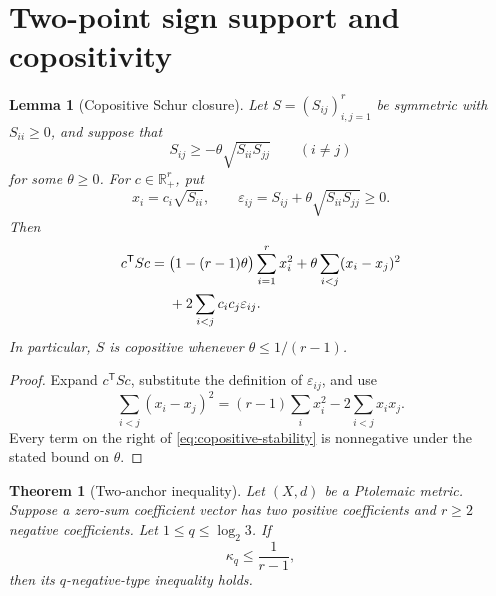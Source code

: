 \documentclass[11pt]{amsart}
\newtheorem{theorem}{Theorem}[section]
\newtheorem{lemma}[lemma]{Lemma}
\theoremstyle{definition}
\theoremstyle{remark}
\newcommand{\R}{\mathbb R}
\begin{document}
\section{Two-point sign support and copositivity}

\begin{lemma}[Copositive Schur closure]\label{lem:copositive-closure}
Let $S=(S_{ij})_{i,j=1}^r$ be symmetric with $S_{ii}\ge0$, and suppose that
\[
 S_{ij}\ge-\theta\sqrt{S_{ii}S_{jj}}
 \qquad(i\ne j)
\]
for some $\theta\ge0$. For $c\in\R_+^r$, put
\[
 x_i=c_i\sqrt{S_{ii}},
 \qquad
 \varepsilon_{ij}=S_{ij}+\theta\sqrt{S_{ii}S_{jj}}\ge0.
\]
Then
\begin{align}
 c^{\mathsf T}Sc
 ={}&
 \bigl(1-(r-1)\theta\bigr)\sum_{i=1}^r x_i^2
 +\theta\sum_{i<j}(x_i-x_j)^2\notag\\
 &+2\sum_{i<j}c_ic_j\varepsilon_{ij}.
 \label{eq:copositive-stability}
\end{align}
In particular, $S$ is copositive whenever $\theta\le1/(r-1)$.
\end{lemma}

\begin{proof}
Expand $c^{\mathsf T}Sc$, substitute the definition of $\varepsilon_{ij}$, and use
\[
 \sum_{i<j}(x_i-x_j)^2
 =(r-1)\sum_i x_i^2-2\sum_{i<j}x_ix_j.
\]
Every term on the right of \eqref{eq:copositive-stability} is nonnegative under the stated bound on $\theta$.
\end{proof}

\begin{theorem}[Two-anchor inequality]\label{thm:two-anchor}
Let $(X,d)$ be a Ptolemaic metric. Suppose a zero-sum coefficient vector has two positive coefficients and $r\ge2$ negative coefficients. Let $1\le q\le\log_2 3$. If
\begin{equation}\label{eq:kappa-condition}
 \kappa_q\le\frac1{r-1},
\end{equation}
then its $q$-negative-type inequality holds.
\end{theorem}
\end{document}
